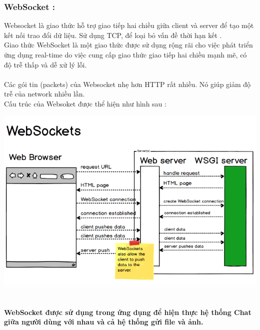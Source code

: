 \documentclass[a4paper]{article}
\begin{document}
		\subsubsection{WebSocket : }
		Websocket là giao thức hỗ trợ giao tiếp hai chiều giữa client và server để tạo một kết nối trao đổi dữ liệu. Sử dụng TCP, để loại bỏ vấn đề thời hạn kết .\\
		Giao thức WebSocket là một giao thức được sử dụng rộng rãi cho việc phát triển ứng dụng real-time do việc cung cấp giao thức giao tiếp hai chiều mạnh mẽ, có độ trễ thấp và dễ xử lý lỗi.\\\\
		Các gói tin (packets) của Websocket nhẹ hơn HTTP rất nhiều. Nó giúp giảm độ trễ của network nhiều lần.\\
		Cấu trúc của Websoket được thể hiện như hình sau : 
			\begin{center}
					\includegraphics[scale=0.7]{Images/websocket.png}
			\end{center}
		\text{}\\
		\textbf{WebSocket được sử dụng trong ứng dụng để hiện thực hệ thống Chat giữa người dùng với nhau và cả hệ thống gửi file và ảnh.}\\
		
\end{document}
